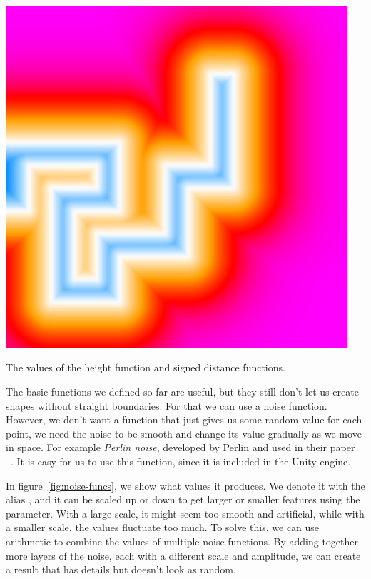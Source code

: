 \begin{center}
\begin{minipage}{.31\textwidth}
        \small{}
        \label{fig:obstacle-sdf}
    \end{minipage}%
    \begin{minipage}{.31\textwidth}
        \centering
        \includegraphics[width=0.95\textwidth]{img/path sdf.png}
        \small{}
        \label{fig:path-sdf}
    \end{minipage}
    \caption{The values of the height function and signed distance functions.}
    \label{fig:basic-fns}
\end{center}

The basic functions we defined so far are useful, but they still don't let us create shapes without straight boundaries.
For that we can use a noise function.
However, we don't want a function that just gives us some random value for each point, we need the noise to be smooth and change its value gradually as we move in space.
For example \emph{Perlin noise}, developed by Perlin and used in their paper ~\cite{PerlinNoise}.
It is easy for us to use this function, since it is included in the Unity engine.

In figure~\ref{fig:noise-funcs}, we show what values it produces.
We denote it with the alias , and it can be scaled up or down to get larger or smaller features using the  parameter.
With a large scale, it might seem too smooth and artificial, while with a smaller scale, the values fluctuate too much.
To solve this, we can use arithmetic to combine the values of multiple noise functions.
By adding together more layers of the noise, each with a different scale and amplitude, we can create a result that has details but doesn't look as random.

